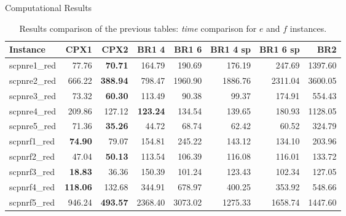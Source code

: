 \documentclass[a4paper,12pt]{mydeitesi_eng}
\begin{document}
\begin{chapter}{Computational Results}
\begin{table}[h]
\begin{center}
\begin{tabular}{l|r|r|r|r|r|r|r}
\textbf{Instance} & \textbf{CPX1} & \textbf{CPX2} & \textbf{BR1 4} &\textbf{BR1 6} & \textbf{BR1 4 sp} & \textbf{BR1 6 sp} & \textbf{BR2} \\
\hline
scpnre1\_red & 77.76 & \textbf{70.71} & 164.79 & 190.69 & 176.19 & 247.69 & 1397.60\\
scpnre2\_red & 666.22 & \textbf{388.94} & 798.47 & 1960.90 & 1886.76 & 2311.04 & 3600.05\\
scpnre3\_red & 73.32 & \textbf{60.30} & 113.49 & 90.38 & 99.37 & 174.91 & 554.43\\
scpnre4\_red & 209.86 & 127.12 & \textbf{123.24} & 134.54 & 139.65 & 180.93 & 1128.05\\
scpnre5\_red & 71.36 & \textbf{35.26} & 44.72 & 68.74 & 62.42 & 60.52 & 324.79\\
\hline

scpnrf1\_red & \textbf{74.90} & 79.07 & 154.81 & 245.22 & 143.12 & 134.10 & 203.96\\
scpnrf2\_red & 47.04 & \textbf{50.13} & 113.54 & 106.39 & 116.08 & 116.01 & 133.72\\
scpnrf3\_red & \textbf{18.83} & 36.36 & 150.39 & 101.24 & 123.43 & 102.34 & 127.05\\
scpnrf4\_red & \textbf{118.06} & 132.68 & 344.91 & 678.97 & 400.25 & 353.92 & 548.66\\
scpnrf5\_red & 946.24 & \textbf{493.57} & 2368.40 & 3073.02 & 1275.33 & 1658.74 & 1447.60\\
\end{tabular}
\end{center}
\caption{Results comparison of the previous tables: \emph{time} comparison for $e$ and $f$ instances.}
\label{tab:ResultTimeComp}
\end{table}



\end{chapter}
\end{document}
